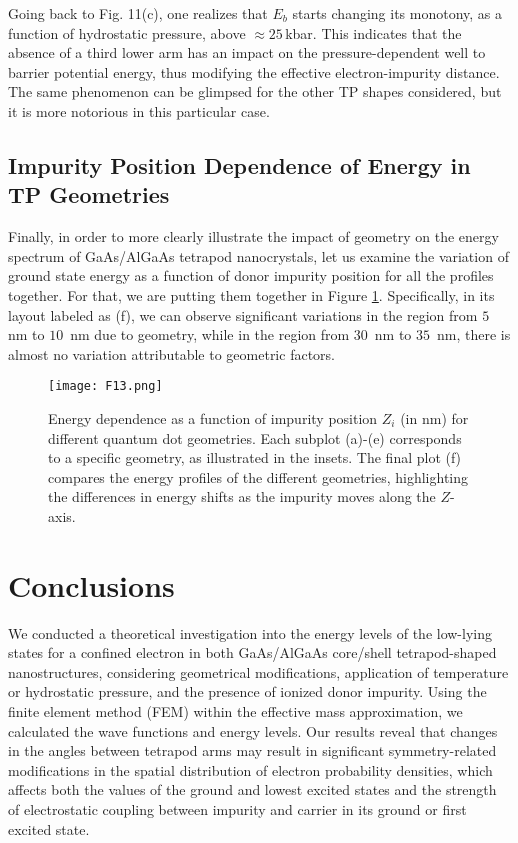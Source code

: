 \documentclass[nanomaterials,article,submit,moreauthors,pdftex]{Definitions/mdpi}
\begin{document}
Going back to Fig. 11(c), one realizes that $E_b$ starts changing its monotony, as a function of hydrostatic pressure, above $\approx 25\,$kbar. This indicates that the absence of a third lower arm has an impact on the pressure-dependent well to barrier potential energy, thus modifying the effective electron-impurity distance. The same phenomenon can be glimpsed for the other TP shapes considered, but it is more notorious in this particular case.

\subsection{Impurity Position Dependence of Energy in TP Geometries}

Finally, in order to more clearly illustrate the impact of geometry on the energy spectrum of GaAs/AlGaAs tetrapod nanocrystals, let us examine the variation of ground state energy as a function of donor impurity position for all the profiles together. For that, we are putting them together in Figure \ref{F13}. Specifically, in its layout labeled as (f), we can observe significant variations in the region from $5\,$ nm to $10\,$ nm due to geometry, while in the region from $30\,$ nm to $35\,$ nm, there is almost no variation attributable to geometric factors.

\begin{figure}[H]
    \centering
    \texttt{[image: F13.png]}
    \caption{Energy dependence as a function of impurity position $Z_{i}$ (in nm) for different quantum dot geometries. Each subplot (a)-(e) corresponds to a specific geometry, as illustrated in the insets. The final plot (f) compares the energy profiles of the different geometries, highlighting the differences in energy shifts as the impurity moves along the $Z$-axis. }
    \label{F13}
\end{figure}

\section{Conclusions} \label{conclusions}

We conducted a theoretical investigation into the energy levels of the low-lying states for a confined electron in both GaAs/AlGaAs core/shell tetrapod-shaped nanostructures, considering geometrical modifications, application of temperature or hydrostatic pressure, and the presence of ionized donor impurity. Using the finite element method (FEM) within the effective mass approximation, we calculated the wave functions and energy levels. Our results reveal that changes in the angles between tetrapod arms may result in significant symmetry-related modifications in the spatial distribution of electron probability densities, which affects both the values of the ground and lowest excited states and the strength of electrostatic coupling between impurity and carrier in its ground or first excited state.
\end{document}
